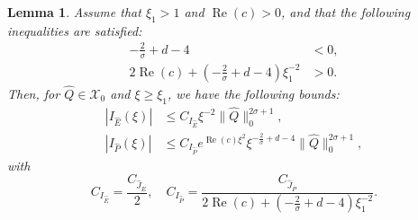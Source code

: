 \documentclass[11pt]{article}
\DeclareMathOperator{\real}{Re}
\newcommand{\Space}{\mathcal{X}}
\newtheorem{lemma}[definition]{Lemma}
\begin{document}
\begin{lemma}\label{lemma:I_E-hat-I_P-hat-bounds}
  Assume that \(\xi_{1} > 1\) and \(\real(c) > 0\), and that the
  following inequalities are satisfied:
  \begin{align*}
    -\frac{2}{\sigma} + d - 4 &< 0,\\
    2\real(c) + \left(-\frac{2}{\sigma} + d - 4\right)\xi_{1}^{-2} &> 0.
  \end{align*}
  Then, for \(\hat{Q} \in \Space_{0}\) and \(\xi \geq \xi_{1}\), we
  have the following bounds:
  \begin{align*}
    |I_{\hat{E}}(\xi)| &\leq C_{I_{\hat{E}}}\xi^{-2}\|\hat{Q}\|_{0}^{2\sigma + 1},\\
    |I_{\hat{P}}(\xi)| &\leq C_{I_{\hat{P}}}e^{\real(c)\xi^{2}}\xi^{-\frac{2}{\sigma} + d - 4}\|\hat{Q}\|_{0}^{2\sigma + 1},
  \end{align*}
  with
  \begin{equation*}
    C_{I_{\hat{E}}} = \frac{C_{\hat{J}_{E}}}{2},\quad
    C_{I_{\hat{P}}} = \frac{C_{\hat{J}_{P}}}{2\real(c) + \left(-\frac{2}{\sigma} + d - 4\right)\xi_{1}^{-2}}.
  \end{equation*}
\end{lemma}
\end{document}
